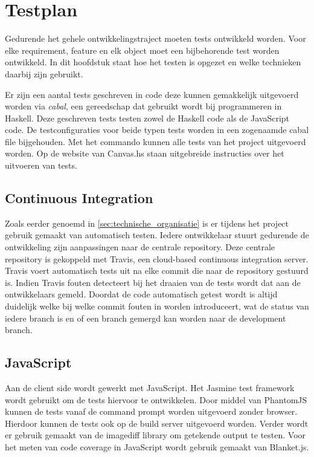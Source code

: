 \chapter{Testplan} \label{hoofdstuk:testplan}
Gedurende het gehele ontwikkelingstraject moeten tests ontwikkeld worden. Voor elke requirement, feature en elk object moet een bijbehorende test worden ontwikkeld. In dit hoofdstuk staat hoe het testen is opgezet en welke technieken daarbij zijn gebruikt.

Er zijn een aantal tests geschreven in code deze kunnen gemakkelijk uitgevoerd worden via \emph{cabal}, een gereedschap dat gebruikt wordt bij programmeren in Haskell. Deze geschreven tests testen zowel de Haskell code als de JavaScript code. De testconfiguraties voor beide typen tests worden in een zogenaamde cabal file bijgehouden. Met het commando  kunnen alle tests van het project uitgevoerd worden. Op de website van Canvas.hs staan uitgebreide instructies over het uitvoeren van tests.

\section{Continuous Integration}
Zoals eerder genoemd in \autoref{sec:technische_organisatie} is er tijdens het project gebruik gemaakt van automatisch testen. Iedere ontwikkelaar stuurt gedurende de ontwikkeling zijn aanpassingen naar de centrale repository. Deze centrale repository is gekoppeld met Travis, een cloud-based continuous integration server. Travis voert automatisch tests uit na elke commit die naar de repository gestuurd is. Indien Travis fouten detecteert bij het draaien van de tests wordt dat aan de ontwikkelaars gemeld. Doordat de code automatisch getest wordt is altijd duidelijk welke bij welke commit fouten in worden introduceert, wat de status van iedere branch is en of een branch gemergd kan worden naar de development branch.

\section{JavaScript} 
Aan de client side wordt gewerkt met JavaScript. Het Jasmine\cite{Jasmine} test framework wordt gebruikt om de tests hiervoor te ontwikkelen. Door middel van PhantomJS\cite{PhantomJS} kunnen de tests vanaf de command prompt worden uitgevoerd zonder browser. Hierdoor kunnen de tests ook op de build server uitgevoerd worden. Verder wordt er gebruik gemaakt van de imagediff\cite{imagediff} library om getekende output te testen. Voor het meten van code coverage in JavaScript wordt gebruik gemaakt van Blanket.js\cite{Blanket.js}.

